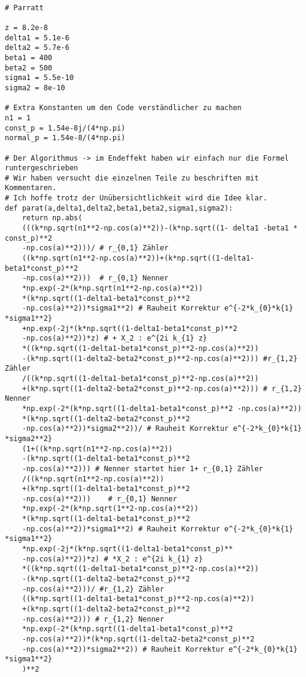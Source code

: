 \begin{verbatim}

# Parratt 

z = 8.2e-8 
delta1 = 5.1e-6
delta2 = 5.7e-6
beta1 = 400 
beta2 = 500
sigma1 = 5.5e-10
sigma2 = 8e-10

# Extra Konstanten um den Code verständlicher zu machen
n1 = 1
const_p = 1.54e-8j/(4*np.pi)
normal_p = 1.54e-8/(4*np.pi)

# Der Algorithmus -> im Endeffekt haben wir einfach nur die Formel runtergeschrieben
# Wir haben versucht die einzelnen Teile zu beschriften mit Kommentaren.
# Ich hoffe trotz der Unübersichtlichkeit wird die Idee klar.
def parat(a,delta1,delta2,beta1,beta2,sigma1,sigma2):
    return np.abs(
    (((k*np.sqrt(n1**2-np.cos(a)**2))-(k*np.sqrt((1- delta1 -beta1 * const_p)**2
    -np.cos(a)**2)))/ # r_{0,1} Zähler
    ((k*np.sqrt(n1**2-np.cos(a)**2))+(k*np.sqrt((1-delta1-beta1*const_p)**2
    -np.cos(a)**2)))  # r_{0,1} Nenner
    *np.exp(-2*(k*np.sqrt(n1**2-np.cos(a)**2))
    *(k*np.sqrt((1-delta1-beta1*const_p)**2
    -np.cos(a)**2))*sigma1**2) # Rauheit Korrektur e^{-2*k_{0}*k{1} *sigma1**2}
    +np.exp(-2j*(k*np.sqrt((1-delta1-beta1*const_p)**2
    -np.cos(a)**2))*z) # + X_2 : e^{2i k_{1} z}
    *((k*np.sqrt((1-delta1-beta1*const_p)**2-np.cos(a)**2)) 
    -(k*np.sqrt((1-delta2-beta2*const_p)**2-np.cos(a)**2))) #r_{1,2} Zähler
    /((k*np.sqrt((1-delta1-beta1*const_p)**2-np.cos(a)**2)) 
    +(k*np.sqrt((1-delta2-beta2*const_p)**2-np.cos(a)**2))) # r_{1,2} Nenner
    *np.exp(-2*(k*np.sqrt((1-delta1-beta1*const_p)**2 -np.cos(a)**2))
    *(k*np.sqrt((1-delta2-beta2*const_p)**2
    -np.cos(a)**2))*sigma2**2))/ # Rauheit Korrektur e^{-2*k_{0}*k{1} *sigma2**2}
    (1+((k*np.sqrt(n1**2-np.cos(a)**2))
    -(k*np.sqrt((1-delta1-beta1*const_p)**2
    -np.cos(a)**2))) # Nenner startet hier 1+ r_{0,1} Zähler
    /((k*np.sqrt(n1**2-np.cos(a)**2))
    +(k*np.sqrt((1-delta1-beta1*const_p)**2
    -np.cos(a)**2)))    # r_{0,1} Nenner
    *np.exp(-2*(k*np.sqrt(1**2-np.cos(a)**2))
    *(k*np.sqrt((1-delta1-beta1*const_p)**2
    -np.cos(a)**2))*sigma1**2) # Rauheit Korrektur e^{-2*k_{0}*k{1} *sigma1**2}
    *np.exp(-2j*(k*np.sqrt((1-delta1-beta1*const_p)**
    -np.cos(a)**2))*z) # *X_2 : e^{2i k_{1} z}
    *((k*np.sqrt((1-delta1-beta1*const_p)**2-np.cos(a)**2)) 
    -(k*np.sqrt((1-delta2-beta2*const_p)**2
    -np.cos(a)**2)))/ #r_{1,2} Zähler
    ((k*np.sqrt((1-delta1-beta1*const_p)**2-np.cos(a)**2))
    +(k*np.sqrt((1-delta2-beta2*const_p)**2
    -np.cos(a)**2))) # r_{1,2} Nenner
    *np.exp(-2*(k*np.sqrt((1-delta1-beta1*const_p)**2
    -np.cos(a)**2))*(k*np.sqrt((1-delta2-beta2*const_p)**2
    -np.cos(a)**2))*sigma2**2)) # Rauheit Korrektur e^{-2*k_{0}*k{1} *sigma1**2}
    )**2
    
    \end{verbatim}